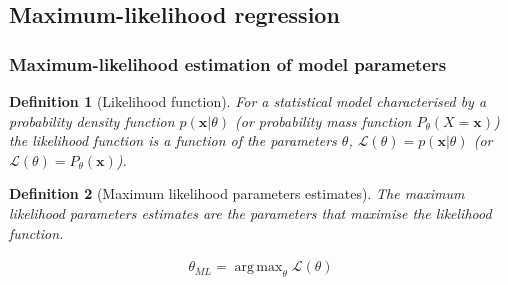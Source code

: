 \documentclass{beamer}
\newtheorem{probDef}{Definition}
\DeclareMathOperator*{\argmax}{arg\,max}
\begin{document}
\subsection{Maximum-likelihood regression}

\begin{frame}
    \frametitle{Maximum-likelihood estimation of model parameters}

	\scriptsize
    \begin{probDef}[Likelihood function]
        For a statistical model characterised by a probability density
        function $p(\mathbf{x}|\theta)$ (or probability mass function
        $P_\theta(X=\mathbf{x})$) the likelihood function is a function of the
        parameters $\theta$, $\mathcal{L}(\theta)=p(\mathbf{x}|\theta)$
        (or $\mathcal{L}(\theta)=P_\theta(\mathbf{x})$).
   \end{probDef}

    \begin{probDef}[Maximum likelihood parameters estimates]
        The maximum likelihood parameters estimates are the parameters that
        maximise the likelihood function.

        \begin{align*}
            \theta_{ML}=\argmax_{\theta}\mathcal{L}(\theta)
        \end{align*}
   \end{probDef}

	\normalsize

\end{frame}
\end{document}
